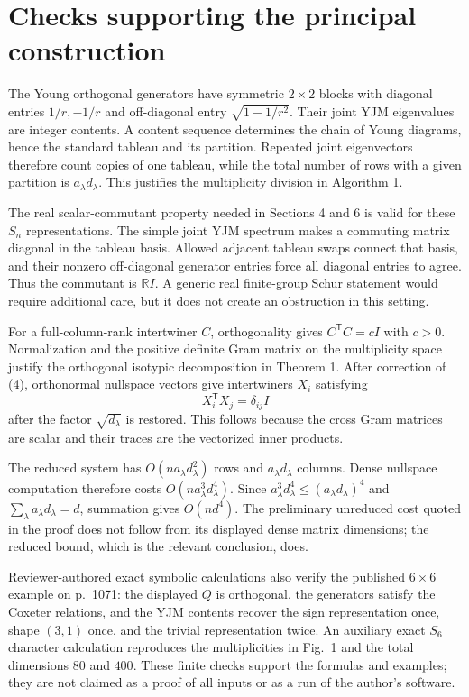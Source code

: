 \documentclass[10pt]{article}
\begin{document}
\section*{Checks supporting the principal construction}
The Young orthogonal generators have symmetric \(2\times2\) blocks with diagonal entries \(1/r,-1/r\) and off-diagonal entry \(\sqrt{1-1/r^2}\). Their joint YJM eigenvalues are integer contents. A content sequence determines the chain of Young diagrams, hence the standard tableau and its partition. Repeated joint eigenvectors therefore count copies of one tableau, while the total number of rows with a given partition is \(a_\lambda d_\lambda\). This justifies the multiplicity division in Algorithm 1.\par
The real scalar-commutant property needed in Sections 4 and 6 is valid for these \(S_n\) representations. The simple joint YJM spectrum makes a commuting matrix diagonal in the tableau basis. Allowed adjacent tableau swaps connect that basis, and their nonzero off-diagonal generator entries force all diagonal entries to agree. Thus the commutant is \(\mathbb RI\). A generic real finite-group Schur statement would require additional care, but it does not create an obstruction in this setting.\par
For a full-column-rank intertwiner \(C\), orthogonality gives \(C^{\mathsf T}C=cI\) with \(c>0\). Normalization and the positive definite Gram matrix on the multiplicity space justify the orthogonal isotypic decomposition in Theorem 1. After correction of (4), orthonormal nullspace vectors give intertwiners \(X_i\) satisfying \[X_i^{\mathsf T}X_j=\delta_{ij}I\] after the factor \(\sqrt{d_\lambda}\) is restored. This follows because the cross Gram matrices are scalar and their traces are the vectorized inner products.\par
The reduced system has \(O(na_\lambda d_\lambda^2)\) rows and \(a_\lambda d_\lambda\) columns. Dense nullspace computation therefore costs \(O(na_\lambda^3d_\lambda^4)\). Since \(a_\lambda^3d_\lambda^4\leq(a_\lambda d_\lambda)^4\) and \(\sum_\lambda a_\lambda d_\lambda=d\), summation gives \(O(nd^4)\). The preliminary unreduced cost quoted in the proof does not follow from its displayed dense matrix dimensions; the reduced bound, which is the relevant conclusion, does.\par
Reviewer-authored exact symbolic calculations also verify the published \(6\times6\) example on p. 1071: the displayed \(Q\) is orthogonal, the generators satisfy the Coxeter relations, and the YJM contents recover the sign representation once, shape \((3,1)\) once, and the trivial representation twice. An auxiliary exact \(S_6\) character calculation reproduces the multiplicities in Fig. 1 and the total dimensions \(80\) and \(400\). These finite checks support the formulas and examples; they are not claimed as a proof of all inputs or as a run of the author’s software.\par
\end{document}
